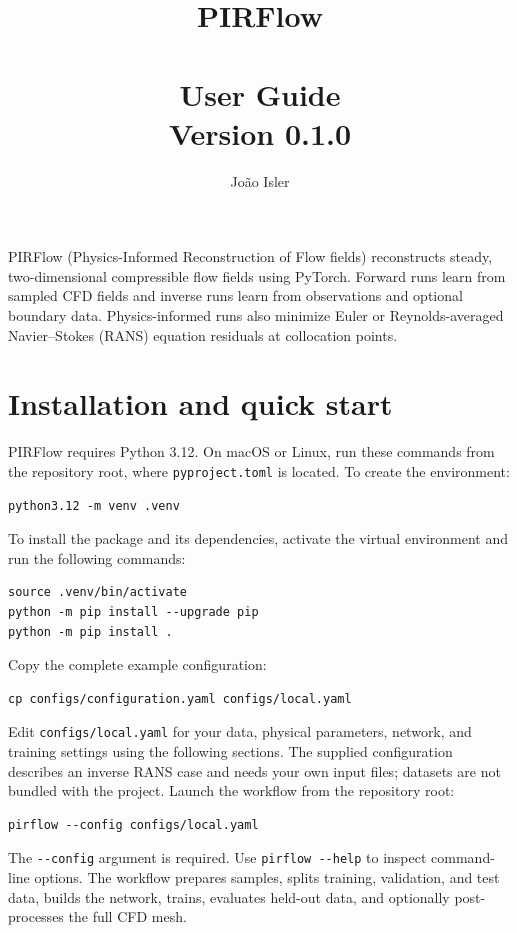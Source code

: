 \documentclass[11pt,a4paper]{article}
\title{PIRFlow\\~\\\large User Guide\\ Version 0.1.0}
\author{João Isler}
\date{}
\newcommand{\code}[1]{\nolinkurl{#1}}
\begin{document}
\maketitle

PIRFlow (Physics-Informed Reconstruction of Flow fields) reconstructs steady,
two-dimensional compressible flow fields using PyTorch. Forward runs learn
from sampled CFD fields and inverse runs learn from observations and optional
boundary data. Physics-informed runs also minimize Euler or Reynolds-averaged
Navier--Stokes (RANS) equation residuals at collocation points.

\setcounter{tocdepth}{1}
\tableofcontents

\section{Installation and quick start}
\label{sec:quick-start}

PIRFlow requires Python 3.12. On macOS or Linux, run these commands from the
repository root, where \code{pyproject.toml} is located. To create the 
environment:

\begin{lstlisting}
python3.12 -m venv .venv
\end{lstlisting}

To install the package and its dependencies, activate the virtual environment 
and run the following commands:

\begin{lstlisting}
source .venv/bin/activate
python -m pip install --upgrade pip
python -m pip install .
\end{lstlisting}

Copy the complete example configuration:

\begin{lstlisting}
cp configs/configuration.yaml configs/local.yaml
\end{lstlisting}

Edit \code{configs/local.yaml} for your data, physical parameters, network,
and training settings using the following sections. The supplied configuration
describes an inverse RANS case and needs your own input files; datasets are not
bundled with the project. Launch the workflow from the repository root:

\begin{lstlisting}
pirflow --config configs/local.yaml
\end{lstlisting}

The \code{--config} argument is required. Use \code{pirflow --help} to inspect
command-line options. The workflow prepares samples, splits training,
validation, and test data, builds the network, trains, evaluates held-out
data, and optionally post-processes the full CFD mesh.
\end{document}
